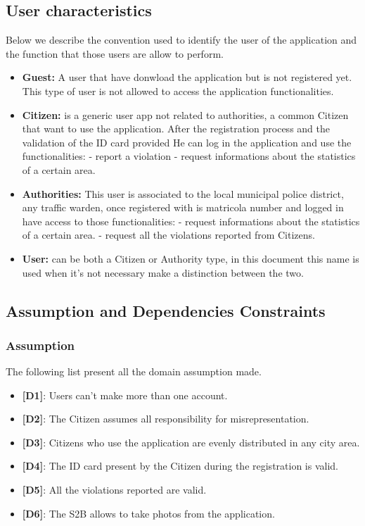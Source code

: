 \documentclass{article}
\begin{document}
\subsection{User characteristics}
Below we describe the convention used to identify the user of the application and the function that those 
users are allow to perform.
\begin{itemize}
    \item \textbf{Guest:} A user that have donwload the application but is not 
    registered yet. This type of user is not allowed to access 
    the application functionalities.
    \item \textbf{Citizen:} is a generic user app not related to authorities, a 
    common Citizen that want to use the application. After the
    registration process and the validation of the ID card provided
    He can log in the application and use the functionalities:
    - report a violation
    - request informations about the statistics of a certain area.
    \item \textbf{Authorities:} This user is associated to the local municipal
    police district, any traffic warden, once registered with 
    is matricola number and logged in have access to those 
    functionalities:
    - request informations about the statistics of a certain area.
    - request all the violations reported from Citizens. 
    \item \textbf{User:} can be both a Citizen or Authority type, in this document
    this name is used when it's not necessary make a distinction 
    between the two.
\end{itemize}

\subsection{Assumption and Dependencies Constraints}
\subsubsection{Assumption}
The following list present all the domain assumption made.
\begin{itemize}
    \item \textbf{[D1]}: Users can't make more than one account.
    \item \textbf{[D2]}: The Citizen assumes all responsibility for misrepresentation.
    \item \textbf{[D3]}: Citizens who use the application are evenly distributed in any city area.
    \item \textbf{[D4]}: The ID card present by the Citizen during the registration is valid.
    \item \textbf{[D5]}: All the violations reported are valid.
    \item \textbf{[D6]}: The S2B allows to take photos from the application.
\end{itemize}
\end{document}
